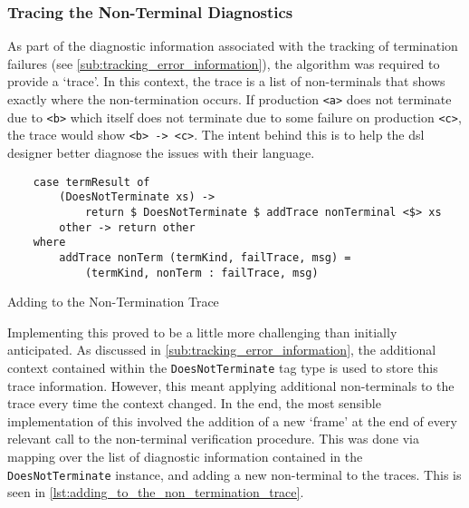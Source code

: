 
\subsubsection{Tracing the Non-Terminal Diagnostics} %
\label{ssub:tracing_the_non_terminal_diagnostics}
As part of the diagnostic information associated with the tracking of termination failures (see \autoref{sub:tracking_error_information}), the algorithm was required to provide a `trace'.
In this context, the trace is a list of non-terminals that shows exactly where the non-termination occurs.
If production \texttt{<a>} does not terminate due to \texttt{<b>} which itself does not terminate due to some failure on production \texttt{<c>}, the trace would show \texttt{<b> -> <c>}.
The intent behind this is to help the \gls{dsl} designer better diagnose the issues with their language.\\

\begin{listing}[!htb]
\begin{verbatim}
    case termResult of
        (DoesNotTerminate xs) ->
            return $ DoesNotTerminate $ addTrace nonTerminal <$> xs
        other -> return other
    where
        addTrace nonTerm (termKind, failTrace, msg) =
            (termKind, nonTerm : failTrace, msg)
\end{verbatim}
\caption{Adding to the Non-Termination Trace}
\label{lst:adding_to_the_non_termination_trace}
\end{listing}

Implementing this proved to be a little more challenging than initially anticipated. 
As discussed in \autoref{sub:tracking_error_information}, the additional context contained within the \texttt{DoesNotTerminate} tag type is used to store this trace information.
However, this meant applying additional non-terminals to the trace every time the context changed.
In the end, the most sensible implementation of this involved the addition of a new `frame' at the end of every relevant call to the non-terminal verification procedure. 
This was done via mapping over the list of diagnostic information contained in the \texttt{DoesNotTerminate} instance, and adding a new non-terminal to the traces. 
This is seen in \autoref{lst:adding_to_the_non_termination_trace}.




